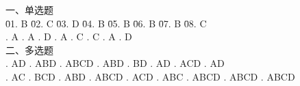 \documentclass[a4paper]{book}
\begin{document}
\begin{tabbing}
一、单选题\\
\= 01. B \qquad \= 02. C \qquad \= 03. D \qquad \= 04. B \qquad \= 05. B \qquad \= 06. B \qquad \= 07. B \qquad \= 08. C \qquad \= \\
. A . A . D . A . C . C . A . D \\
二、多选题\\
. AD   . ABD  . ABCD . ABD  . BD   . AD   . ACD  . AD\\
. AC   . BCD  . ABD  . ABCD . ACD  . ABC  . ABCD . ABCD . ABCD\\
\end{tabbing}
\end{document}
